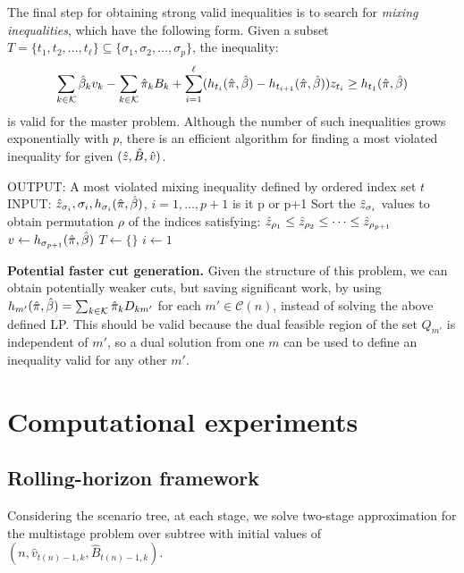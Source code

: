 \documentclass[10pt]{article}
\newcommand{\ti}{t} %
\newcommand{\ka}{k} %
\newcommand{\KA}{\mathcal{K}}
\newcommand{\Bi}{B} %
\newcommand{\Vi}{v} %
\newcommand{\Zed}{z} %
\newcommand{\cn}{\mathcal{C}(n) }
\newcommand{\cred}{\color{red!65!black}}
\begin{document}
The final step for obtaining strong valid inequalities is to search for {\it mixing inequalities}, which have the following form. Given a subset $T = \{t_1,t_2,\ldots,t_{\ell}\} \subseteq \{\sigma_1,\sigma_2,\ldots,\sigma_p\}$, the inequality:
\[  \sum_{\ka  \in \KA} \betasol_k \Vi_k - \sum_{\ka  \in \KA} \pisol_k \Bi_k + 
\sum_{i=1}^{\ell} (h_{t_i}(\pisol,\betasol) - h_{t_{i+1}}(\pisol,\betasol))\Zed_{t_i}
\geq  h_{t_1}(\pisol,\betasol) \]
is valid for the master problem. Although the number of such inequalities grows exponentially with $p$, there is an efficient algorithm for finding a most violated inequality for given $(\zsol,\bsol,\vsol)$. 

\begin{algorithm}[H]
\SetAlgoLined
{OUTPUT: A most violated mixing inequality defined by ordered index set $\ti$ } \;
INPUT: $\zsol_{\sigma_i}, \sigma_i, h_{\sigma_i}(\pisol,\betasol)$, $i=1,\ldots,p+1$  {\cred is it p or p+1}\;
Sort the $\zsol_{\sigma_i}$ values to obtain permutation $\rho$ of the indices satisfying:
$\zsol_{\rho_1} \leq \zsol_{\rho_2} \leq \cdots \leq \zsol_{\rho_{p+1}} $ \;
$v \gets h_{\sigma_{p+1}}(\hat{\pi},\hat{\beta})$\;
$T \gets \{ \}$\;
$ i \gets 1$\;

\end{algorithm}

{\bf Potential faster cut generation.} Given the structure of this problem,  we can obtain potentially weaker cuts, but saving significant work, by using $h_{m'}(\pisol,\betasol) = \sum_{\ka  \in \KA} \pisol_k D_{km'}$ for each $m' \in \cn$, instead of solving the above defined LP. This should be valid because the dual feasible region of the set $Q_{m'}$ is independent of $m'$, so a dual solution from one $m$ can be used to define an inequality valid for any other $m'$.



  

\section{Computational experiments}
\subsection{Rolling-horizon framework}
\label{Sec:Rolling}

Considering the scenario tree,  at each stage, we solve two-stage approximation for the multistage problem over
subtree with initial values of $(n,\hat{\Vi}_{\ti(n)-1 , \ka},\hat{\Bi}_{\ti(n)-1 , \ka})$.
\end{document}
